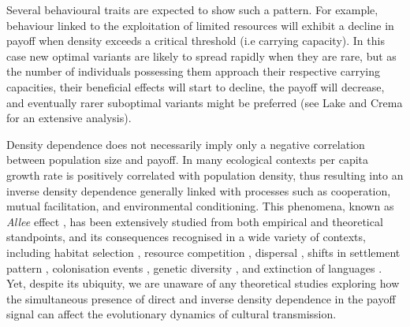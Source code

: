 \documentclass[review,authoryear]{elsarticle}
\begin{document}
Several behavioural traits are expected to show such a pattern. For example, behaviour linked to the exploitation of limited resources will exhibit a decline in payoff when density exceeds a critical threshold (i.e carrying capacity). In this case new optimal variants are likely to spread rapidly when they are rare, but as the number of individuals possessing them approach their respective carrying capacities, their beneficial effects will start to decline, the payoff will decrease, and eventually rarer suboptimal variants might be preferred (see Lake and Crema \citeyear{lake_and_crema_2012} for an extensive analysis). 

Density dependence does not necessarily imply only a negative correlation between population size and payoff. In many ecological contexts per capita growth rate is positively correlated with population density, thus resulting into an inverse density dependence generally linked with processes such as cooperation, mutual facilitation, and environmental conditioning. This phenomena, known as \emph{Allee} effect \citep{allee1958,courchamp_etal_1999}, has been extensively studied  from both empirical and theoretical standpoints, and its consequences recognised in a wide variety of contexts, including habitat selection \citep{greene_and_stamps_2001}, resource competition \citep{jang2013},  dispersal \citep{steele_2009}, shifts in settlement pattern \citep{crema_2014}, colonisation events  \citep{kennet_etal_2006}, genetic diversity \citep{roques_etal_2012}, and extinction of languages \citep{sutherland_2003}. Yet, despite its ubiquity, we are unaware of any theoretical studies exploring how the simultaneous presence of direct and inverse density dependence in the payoff signal can affect the evolutionary dynamics of cultural transmission.   
\end{document}
